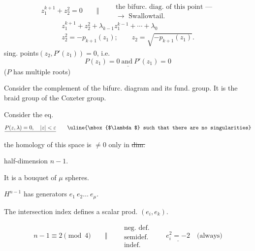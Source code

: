\[
z_1^{k+1}+z_2^2=0
\qquad\Vert\qquad
\begin{gathered}
\text{the bifurc. diag. of this point —}\\[-.2ex]
\longrightarrow\text{ Swallowtail}.
\end{gathered}
\]
\[
\begin{gathered}
z_1^{k+1}+z_2^2+\lambda_{k-1}z_1^{k-1}+\cdots+\lambda_0\\
z_2^2=-p_{k+1}(z_1);\qquad z_2=\sqrt{-p_{k+1}(z_1)}.
\end{gathered}
\]
sing. points\quad $(z_2,P'(z_1))=0$, i.e.
\[
\underline{P(z_1)=0\ \text{and}\ P'(z_1)=0}
\]
($P$ has multiple roots)


Consider the complement of the bifurc. diagram and its fund. group.
It is the braid group of the Coxeter group.

Consider the eq.
\[
\underline{P(z,\lambda)=0,\quad |z|<\varepsilon}
\qquad\text{\uline{\mbox{$\lambda$} such that there are no singularities}}
\]


the homology of this space is $\ne0$ only in \sout{dim.}

half-dimension $n-1$.

It is a bouquet of $\mu$ spheres.



$H^{n-1}$ has generators $e_1\ e_2\ldots\ e_\mu$.

The intersection index defines a scalar prod. $(e_i,e_k)$.

\[
n-1\equiv2\pmod4\qquad\Vert\qquad
\begin{gathered}
\text{neg. def.}\\
\text{semidef.}\\
\text{indef.}
\end{gathered}
\qquad\underline{e_i^2=-2}\quad\text{(always)}
\]


